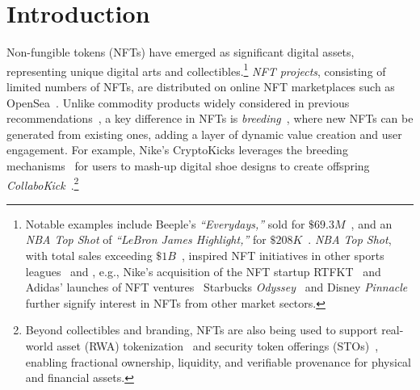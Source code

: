 \documentclass[conference]{IEEEtran}
\theoremstyle{plain}
\begin{document}





%
\IEEEpeerreviewmaketitle

\section{Introduction}

Non-fungible tokens (NFTs) have emerged as significant digital assets, representing unique digital arts and collectibles.\footnote{Notable examples include Beeple's \emph{``Everydays,''} sold for $\$69.3M$~\cite{beeple2021}, and an \emph{NBA Top Shot} of \emph{``LeBron James Highlight,''} for $\$208K$~\cite{nbatopshot}.  \emph{NBA Top Shot}, with total sales exceeding $\$1B$~\cite{topshot1b}, inspired NFT initiatives in other sports leagues~\cite{nflallday, ufcstrike, nhlbreakaway} and , e.g., Nike's acquisition of the NFT startup RTFKT~\cite{nike2021acquiresrtfkt}  and Adidas' launches of NFT ventures~ Starbucks \emph{Odyssey}~\cite{starbucks2022odyssey} and Disney \emph{Pinnacle}~\cite{yahoo2023disneydapperlabs} further signify interest in NFTs from other market sectors.} \emph{NFT projects}, consisting of limited numbers of NFTs, are distributed on online NFT marketplaces such as OpenSea~\cite{opensea}. Unlike commodity products widely considered in previous recommendations~\cite{he2020lightgcn, yang2021consisrec}, a key difference in NFTs is \textit{breeding}~\cite{wu2023critical, sawhney2023nike}, where new NFTs can be generated from existing ones, adding a layer of dynamic value creation and user engagement. For example, Nike's CryptoKicks leverages the breeding mechanisms~\cite{sawhney2023nike} for users to mash-up digital shoe designs to create offspring \textit{CollaboKick}~.\footnote{Beyond collectibles and branding, NFTs are also being used to support real-world asset (RWA) tokenization~\cite{notheisen2017trading} and security token offerings (STOs)~\cite{kreppmeier2023real}, enabling fractional ownership, liquidity, and verifiable provenance for physical and financial assets.}
\end{document}
